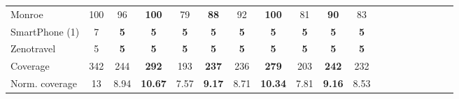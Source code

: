 \begin{table}
{\begin{tabular}{lccccccccccccccccccl}
\midrule 
 Monroe & 100 & 96 & \textbf{100} & 79 & \textbf{88} & 92 & \textbf{100} & 81 & \textbf{90} &\multicolumn{2}{c}{ 83  } \\ 
SmartPhone (1) & 7 & \textbf{5} & \textbf{5} & \textbf{5} & \textbf{5} & \textbf{5} & \textbf{5} & \textbf{5} & \textbf{5} &\multicolumn{2}{c}{ \textbf{5}  } \\ 
Zenotravel & 5 & \textbf{5} & \textbf{5} & \textbf{5} & \textbf{5} & \textbf{5} & \textbf{5} & \textbf{5} & \textbf{5} &\multicolumn{2}{c}{ \textbf{5}  } \\ 
\midrule 
 Coverage & 342 & 244 & \textbf{292} & 193 & \textbf{237} & 236 & \textbf{279} & 203 & \textbf{242} &\multicolumn{2}{c}{ 232  } \\ 
Norm. coverage & 13 & 8.94 & \textbf{10.67} & 7.57 & \textbf{9.17} & 8.71 & \textbf{10.34} & 7.81 & \textbf{9.16} &\multicolumn{2}{c}{ 8.53  } \\ 
\bottomrule 
 \end{tabular} 
} 
\end{table} 
